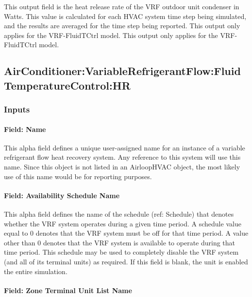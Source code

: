 This output field is the heat release rate of the VRF outdoor unit condenser in Watts. This value is calculated for each HVAC system time step being simulated, and the results are averaged for the time step being reported. This output only applies for the VRF-FluidTCtrl model. This output only applies for the VRF-FluidTCtrl model.



\subsection{AirConditioner:VariableRefrigerantFlow:FluidTemperatureControl:HR}\label{airconditionervariablerefrigerantflowfluidtemperaturecontrolhr}

\subsubsection{Inputs}

\paragraph{Field: Name}

This alpha field defines a unique user-assigned name for an instance of a variable refrigerant flow heat recovery system. Any reference to this system will use this name. Since this object is not listed in an AirloopHVAC object, the most likely use of this name would be for reporting purposes.

\paragraph{Field: Availability Schedule Name}

This alpha field defines the name of the schedule (ref: Schedule) that denotes whether the VRF system operates during a given time period. A schedule value equal to 0 denotes that the VRF system must be off for that time period. A value other than 0 denotes that the VRF system is available to operate during that time period. This schedule may be used to completely disable the VRF system (and all of its terminal units) as required. If this field is blank, the unit is enabled the entire simulation.

\paragraph{Field: Zone Terminal Unit List Name}

